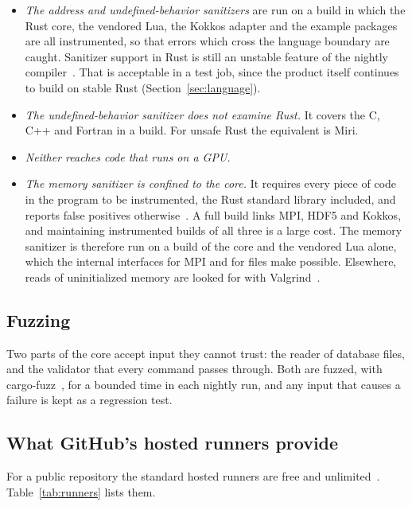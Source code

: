 \documentclass[11pt,a4paper]{article}
\begin{document}
\begin{itemize}
  \item \emph{The address and undefined-behavior sanitizers} are run on a
        build in which the Rust core, the vendored Lua, the Kokkos adapter
        and the example packages are all instrumented, so that errors which
        cross the language boundary are caught.  Sanitizer support in Rust
        is still an unstable feature of the nightly
        compiler~\cite{rustsanitizers}.  That is acceptable in a test job,
        since the product itself continues to build on stable Rust
        (Section~\ref{sec:language}).
  \item \emph{The undefined-behavior sanitizer does not examine Rust.}  It
        covers the C, C++ and Fortran in a build.  For unsafe Rust the
        equivalent is Miri.
  \item \emph{Neither reaches code that runs on a GPU.}
  \item \emph{The memory sanitizer is confined to the core.}  It requires
        every piece of code in the program to be instrumented, the Rust
        standard library included, and reports false positives
        otherwise~\cite{rustsanitizers}.  A full build links MPI, HDF5 and
        Kokkos, and maintaining instrumented builds of all three is a large
        cost.  The memory sanitizer is therefore run on a build of the core
        and the vendored Lua alone, which the internal interfaces for MPI
        and for files make possible.  Elsewhere, reads of uninitialized
        memory are looked for with Valgrind~\cite{valgrind}.
\end{itemize}

\subsection{Fuzzing}
\label{sec:fuzzing}

Two parts of the core accept input they cannot trust: the reader of
database files, and the validator that every command passes through.  Both
are fuzzed, with cargo-fuzz~\cite{cargofuzz}, for a bounded time in each
nightly run, and any input that causes a failure is kept as a regression
test.

\subsection{What GitHub's hosted runners provide}

For a public repository the standard hosted runners are free and
unlimited~\cite{ghrunners}.  Table~\ref{tab:runners} lists them.
\end{document}
